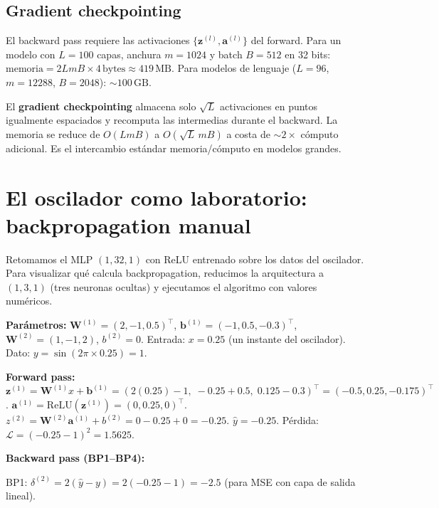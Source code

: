 \subsection{Gradient checkpointing}
\label{subsec:checkpointing}

El backward pass requiere las activaciones
$\{\bm{z}^{(l)}, \bm{a}^{(l)}\}$ del forward. Para un modelo con
$L = 100$ capas, anchura $m = 1024$ y batch $B = 512$ en 32 bits:
$\text{memoria} = 2LmB \times 4\,\text{bytes} \approx 419\,\text{MB}$.
Para modelos de lenguaje ($L = 96$, $m = 12288$, $B = 2048$):
$\sim 100\,\text{GB}$.

El \textbf{gradient checkpointing} almacena solo $\sqrt{L}$ activaciones
en puntos igualmente espaciados y recomputa las intermedias durante el
backward. La memoria se reduce de $O(LmB)$ a $O(\sqrt{L}\,mB)$ a costa
de $\sim 2\times$ cómputo adicional. Es el intercambio estándar
memoria/cómputo en modelos grandes.

\section{El oscilador como laboratorio: backpropagation manual}
\label{sec:oscilador6}


Retomamos el MLP $(1, 32, 1)$ con ReLU entrenado sobre los datos del
oscilador. Para visualizar qué calcula backpropagation, reducimos la
arquitectura a $(1, 3, 1)$ (tres neuronas ocultas) y ejecutamos el
algoritmo con valores numéricos.

\textbf{Parámetros:}
$\bm{W}^{(1)} = (2, -1, 0.5)^\top$,
$\bm{b}^{(1)} = (-1, 0.5, -0.3)^\top$,
$\bm{W}^{(2)} = (1, -1, 2)$, $b^{(2)} = 0$.
Entrada: $x = 0.25$ (un instante del oscilador).
Dato: $y = \sin(2\pi \times 0.25) = 1$.

\textbf{Forward pass:}
$\bm{z}^{(1)} = \bm{W}^{(1)}x + \bm{b}^{(1)}
= (2(0.25)-1,\; -0.25+0.5,\; 0.125-0.3)^\top = (-0.5, 0.25, -0.175)^\top$.
$\bm{a}^{(1)} = \text{ReLU}(\bm{z}^{(1)}) = (0, 0.25, 0)^\top$.
$z^{(2)} = \bm{W}^{(2)}\bm{a}^{(1)} + b^{(2)} = 0 - 0.25 + 0 = -0.25$.
$\hat{y} = -0.25$. Pérdida: $\mathcal{L} = (-0.25 - 1)^2 = 1.5625$.

\textbf{Backward pass (BP1–BP4):}

BP1: $\delta^{(2)} = 2(\hat{y}-y) = 2(-0.25-1) = -2.5$ (para MSE con
capa de salida lineal).

